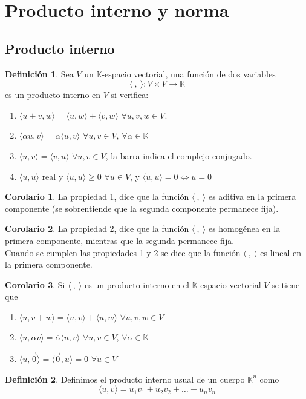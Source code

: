 \documentclass[10pt]{article}
\theoremstyle{definition}
\newtheorem{definition}{Definición}[section]
\newtheorem{corollary}{Corolario}[theorem]
\begin{document}
\section{Producto interno y norma}
\subsection{Producto interno}
\begin{definition}
	Sea $V$ un $\mathbb{K}$-espacio vectorial, una función de dos variables $$\langle \ ,\ \rangle :V\times V\rightarrow \mathbb{K}$$
	es un producto interno en $V$ si verifica:
	\begin{enumerate}
		\item $\langle u+v, w \rangle = \langle u,w \rangle + \langle v,w \rangle$ $\forall u,v,w\in V$.
		\item $\langle\alpha u,v \rangle = \alpha\langle u,v \rangle$ $\forall u,v\in V$, $\forall\alpha\in\mathbb{K}$
		\item $\langle u,v\rangle = \overline{\langle v,u \rangle}$ $\forall u,v\in V$, la barra indica el complejo conjugado.
		\item $\langle u,u \rangle$ real y $\langle u,u \rangle\ge 0$ $\forall u\in V$, y $\langle u,u \rangle =0\Leftrightarrow u=0$
	\end{enumerate}
\end{definition}
\begin{corollary}
	La propiedad 1, dice que la función $\langle \ ,\ \rangle$ es aditiva en la primera componente (se sobrentiende que la segunda componente permanece fija).
\end{corollary}
\begin{corollary}
	La propiedad 2, dice que la función $\langle \ ,\ \rangle$ es homogénea en la primera componente, mientras que la segunda permanece fija.
	\\Cuando se cumplen las propiedades 1 y 2 se dice que la función $\langle \ ,\ \rangle$ es lineal en la primera componente.
\end{corollary}
\begin{corollary}
	Si $\langle \ ,\ \rangle$ es un producto interno en el $\mathbb{K}$-espacio vectorial $V$ se tiene que
	\begin{enumerate}[label=\alph*)]
		\item $\langle u,v+w \rangle = \langle u,v \rangle + \langle u,w \rangle$ $\forall u,v,w\in V$
		\item $\langle u,\alpha v \rangle = \overline{\alpha}\langle u,v\rangle$ $\forall u,v\in V$, $\forall\alpha\in\mathbb{K}$
		\item $\langle u,\vec{0}\rangle =\langle\vec{0} ,u\rangle =0$ $\forall u\in V$
	\end{enumerate}
\end{corollary}
\begin{definition}
	Definimos el producto interno usual de un cuerpo $\mathbb{K}^n$ como $$\langle u,v \rangle = u_1 \overline{v_1} +u_2\overline{v_2}+\dots+u_n\overline{v_n}$$
\end{definition}
\end{document}

